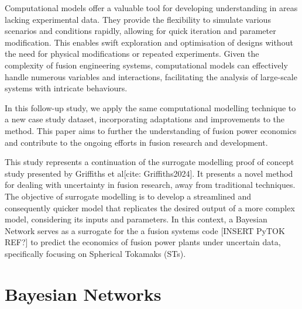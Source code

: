 \documentclass[lettersize,journal]{IEEEtran}
\begin{document}
Computational models offer a valuable tool for developing understanding in areas lacking experimental data. They provide the flexibility to simulate various scenarios and conditions rapidly, allowing for quick iteration and parameter modification. This enables swift exploration and optimisation of designs without the need for physical modifications or repeated experiments. Given the complexity of fusion engineering systems, computational models can effectively handle numerous variables and interactions, facilitating the analysis of large-scale systems with intricate behaviours.

In this follow-up study, we apply the same computational modelling technique to a new case study dataset, incorporating adaptations and improvements to the method. This paper aims to further the understanding of fusion power economics and contribute to the ongoing efforts in fusion research and development.

This study represents a continuation of the surrogate modelling proof of concept study presented by Griffiths et al[cite: Griffiths2024]. It presents a novel method for dealing with uncertainty in fusion research, away from traditional techniques. The objective of surrogate modelling is to develop a streamlined and consequently quicker model that replicates the desired output of a more complex model, considering its inputs and parameters. In this context, a Bayesian Network serves as a surrogate for the a fusion systems code [INSERT PyTOK REF?] to predict the economics of fusion power plants under uncertain data, specifically focusing on Spherical Tokamaks (STs). 

\section{Bayesian Networks}\label{sec:BNs}
\end{document}
